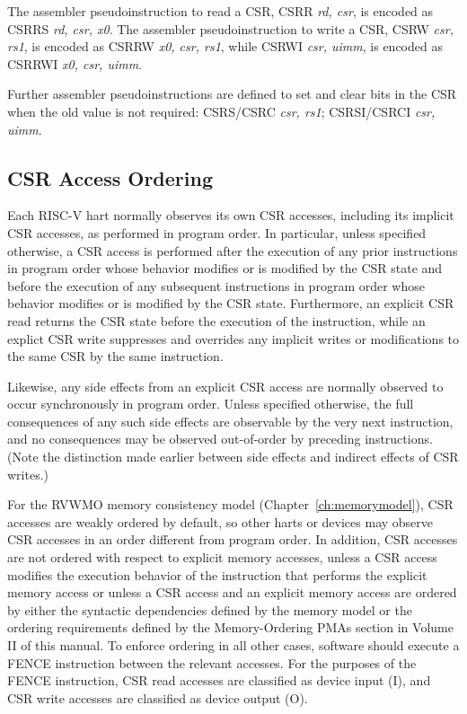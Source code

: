The assembler pseudoinstruction to read a CSR, CSRR {\em rd, csr}, is
encoded as CSRRS {\em rd, csr, x0}.  The assembler pseudoinstruction
to write a CSR, CSRW {\em csr, rs1}, is encoded as CSRRW {\em x0, csr,
  rs1}, while CSRWI {\em csr, uimm}, is encoded as CSRRWI {\em x0,
  csr, uimm}.

Further assembler pseudoinstructions are defined to set and clear
bits in the CSR when the old value is not required: CSRS/CSRC {\em
  csr, rs1}; CSRSI/CSRCI {\em csr, uimm}.


\subsection*{CSR Access Ordering}

Each RISC-V hart normally observes its own CSR accesses, including its
implicit CSR accesses, as performed in program order.
In particular, unless specified otherwise, a CSR access is performed
after the execution of any prior instructions in program order whose behavior
modifies or is modified by the CSR state and before the execution of any
subsequent instructions in program order whose behavior modifies or is modified
by the CSR state.
Furthermore, an explicit CSR read returns the
CSR state before the execution of the instruction, while an
explict CSR write suppresses and overrides any implicit writes or
modifications to the same CSR by the same instruction.

Likewise, any side effects from an explicit CSR access are normally
observed to occur synchronously in program order.
Unless specified otherwise, the full consequences of any such side
effects are observable by the very next instruction, and no consequences
may be observed out-of-order by preceding instructions.
(Note the distinction made earlier between side effects and indirect
effects of CSR writes.)

For the RVWMO memory consistency model (Chapter~\ref{ch:memorymodel}),
CSR accesses are weakly ordered by default,
so other harts or devices may observe CSR accesses in an order
different from program order. In addition, CSR accesses are not ordered with
respect to explicit memory accesses, unless a CSR access modifies the execution
behavior of the instruction that performs the explicit memory access or unless
a CSR access and an explicit memory access are ordered by either the syntactic
dependencies defined by the memory model or the ordering requirements defined
by the Memory-Ordering PMAs section in Volume II of this manual. To enforce
ordering in all other cases, software should execute a FENCE instruction
between the relevant accesses. For the purposes of the FENCE instruction, CSR
read accesses are classified as device input (I), and CSR write accesses are
classified as device output (O).


